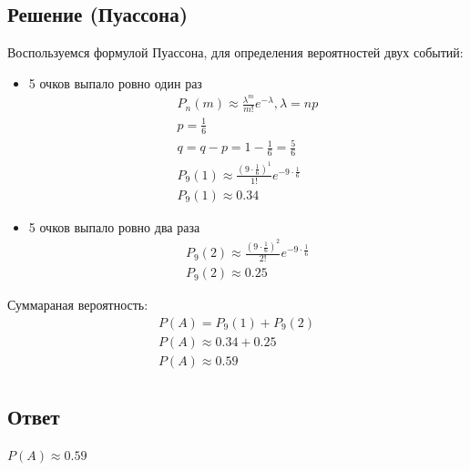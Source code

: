 \documentclass[12pt]{article}
\begin{document}
\subsection*{Решение (Пуассона)}
Воспользуемся формулой Пуассона, для определения вероятностей двух событий:
\begin{itemize}
	\item 5 очков выпало ровно один раз \\
	      \begin{gather*}
		      P_n(m) \approx \frac{\lambda^m}{m!}e^{-\lambda}, \lambda = np \\
		      p = \frac{1}{6} \\
		      q = q - p = 1 - \frac{1}{6} = \frac{5}{6} \\
		      P_9(1) \approx \frac{(9 \cdot \frac{1}{6})^1}{1!}e^{-9 \cdot \frac{1}{6}} \\
		      P_9(1) \approx 0.34
	      \end{gather*}
	\item 5 очков выпало ровно два раза \\
	      \begin{gather*}
		      P_9(2) \approx \frac{(9 \cdot \frac{1}{6})^2}{2!}e^{-9 \cdot \frac{1}{6}} \\
		      P_9(2) \approx 0.25
	      \end{gather*}
\end{itemize}

Суммараная вероятность:
\begin{gather*}
	P(A) = P_9(1) + P_9(2) \\
	P(A) \approx 0.34 + 0.25 \\
	P(A) \approx 0.59 \\
\end{gather*}
\subsection*{Ответ}
$P(A) \approx 0.59$
\end{document}
